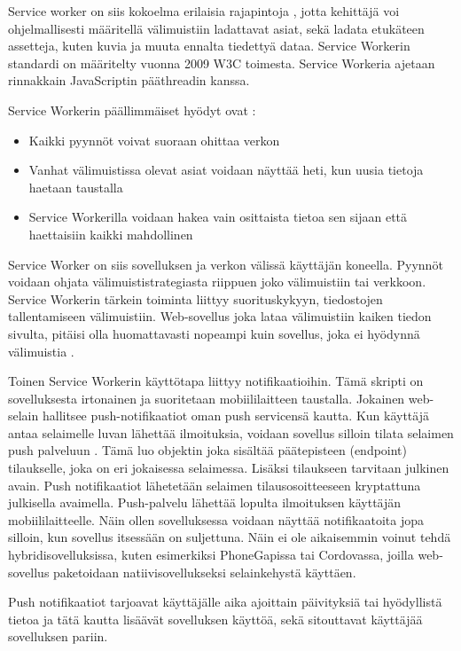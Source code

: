\documentclass{tktltiki}
\begin{document}
Service worker on siis kokoelma erilaisia rajapintoja \cite{malavolta2017assessing}, jotta kehittäjä voi ohjelmallisesti määritellä välimuistiin ladattavat asiat, sekä ladata etukäteen assetteja, kuten kuvia ja muuta ennalta tiedettyä dataa. Service Workerin standardi on määritelty vuonna 2009 W3C toimesta. Service Workeria ajetaan rinnakkain JavaScriptin pääthreadin kanssa.

Service Workerin päällimmäiset hyödyt ovat \cite{GoogleDevSummit}:

\begin{itemize}
  \item Kaikki pyynnöt voivat suoraan ohittaa verkon
  \item Vanhat välimuistissa olevat asiat voidaan näyttää heti, kun uusia tietoja haetaan taustalla
  \item Service Workerilla voidaan hakea vain osittaista tietoa sen sijaan että haettaisiin kaikki mahdollinen
\end{itemize}

Service Worker on siis sovelluksen ja verkon välissä käyttäjän koneella. Pyynnöt voidaan ohjata välimuististrategiasta riippuen joko välimuistiin tai verkkoon. Service Workerin tärkein toiminta liittyy suorituskykyyn, tiedostojen tallentamiseen välimuistiin. Web-sovellus joka lataa välimuistiin kaiken tiedon sivulta, pitäisi olla huomattavasti nopeampi kuin sovellus, joka ei hyödynnä välimuistia \cite{Walton}.

Toinen Service Workerin käyttötapa liittyy notifikaatioihin. Tämä skripti on sovelluksesta irtonainen ja suoritetaan mobiililaitteen taustalla. Jokainen web-selain hallitsee push-notifikaatiot oman push servicensä kautta. Kun käyttäjä antaa selaimelle luvan lähettää ilmoituksia, voidaan sovellus silloin tilata selaimen push palveluun \cite{Googleb}. Tämä luo objektin joka sisältää päätepisteen (endpoint) tilaukselle, joka on eri jokaisessa selaimessa. Lisäksi tilaukseen tarvitaan julkinen avain. Push notifikaatiot lähetetään selaimen tilausosoitteeseen kryptattuna julkisella avaimella. Push-palvelu lähettää lopulta ilmoituksen käyttäjän mobiililaitteelle. Näin ollen sovelluksessa voidaan näyttää notifikaatoita jopa silloin, kun sovellus itsessään on suljettuna. Näin ei ole aikaisemmin voinut tehdä hybridisovelluksissa, kuten esimerkiksi PhoneGapissa tai Cordovassa, joilla web-sovellus paketoidaan natiivisovellukseksi selainkehystä käyttäen.

Push notifikaatiot tarjoavat käyttäjälle aika ajoittain päivityksiä tai hyödyllistä tietoa ja tätä kautta lisäävät sovelluksen käyttöä, sekä sitouttavat käyttäjää sovelluksen pariin. \cite{8441701}
\end{document}
